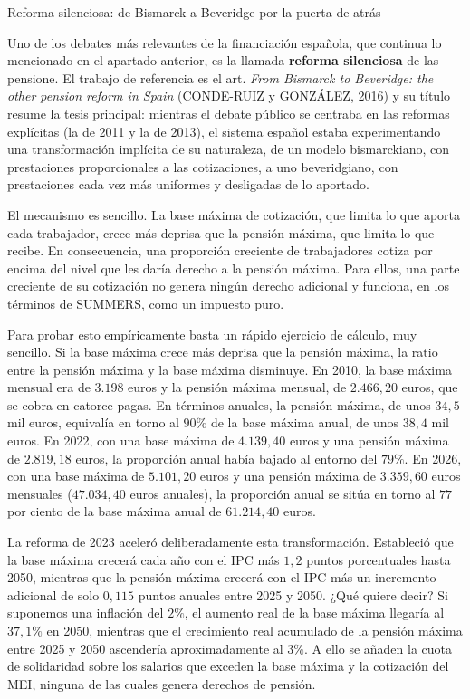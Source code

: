 \documentclass[10pt,a4paper]{article}
\begin{document}
Reforma silenciosa: de Bismarck a Beveridge por la puerta de atrás

Uno de los debates más relevantes de la financiación española, que continua lo mencionado en el apartado anterior, es la llamada \textbf{reforma silenciosa} de las pensione. El trabajo de referencia es el art. \textit{From Bismarck to Beveridge: the other pension reform in Spain} (CONDE-RUIZ y GONZÁLEZ, 2016) y su título resume la tesis principal: mientras el debate público se centraba en las reformas explícitas (la de 2011 y la de 2013), el sistema español estaba experimentando una transformación implícita de su naturaleza, de un modelo bismarckiano, con prestaciones proporcionales a las cotizaciones, a uno beveridgiano, con prestaciones cada vez más uniformes y desligadas de lo aportado. 

El mecanismo es sencillo. La base máxima de cotización, que limita lo que aporta cada trabajador, crece más deprisa que la pensión máxima, que limita lo que recibe. En consecuencia, una proporción creciente de trabajadores cotiza por encima del nivel que les daría derecho a la pensión máxima. Para ellos, una parte creciente de su cotización no genera ningún derecho adicional y funciona, en los términos de SUMMERS, como un impuesto puro.


Para probar esto empíricamente basta un rápido ejercicio de cálculo, muy sencillo. Si la base máxima crece más deprisa que la pensión máxima, la ratio entre la pensión máxima y la base máxima disminuye. En 2010, la base máxima mensual era de $3{.}198$ euros y la pensión máxima mensual, de $2{.}466,20$ euros, que se cobra en catorce pagas. En términos anuales, la pensión máxima, de unos $34,5$ mil euros, equivalía en torno al $90\%$ de la base máxima anual, de unos $38,4$ mil euros. En 2022, con una base máxima de $4{.}139,40$ euros y una pensión máxima de $2{.}819,18$ euros, la proporción anual había bajado al entorno del $79\%$. En 2026, con una base máxima de $5{.}101,20$ euros y una pensión máxima de $3{.}359,60$ euros mensuales ($47{.}034,40$ euros anuales), la proporción anual se sitúa en torno al $77$ por ciento de la base máxima anual de $61{.}214,40$ euros. 

La reforma de 2023 aceleró deliberadamente esta transformación. Estableció que la base máxima crecerá cada año con el IPC más $1,2$ puntos porcentuales hasta 2050, mientras que la pensión máxima crecerá con el IPC más un incremento adicional de solo $0,115$ puntos anuales entre 2025 y 2050. ¿Qué quiere decir? Si suponemos una inflación del $2\%$, el aumento real de la base máxima llegaría al $37,1\%$ en 2050, mientras que el crecimiento real acumulado de la pensión máxima entre 2025 y 2050 ascendería aproximadamente al $3\%$. A ello se añaden la cuota de solidaridad sobre los salarios que exceden la base máxima y la cotización del MEI, ninguna de las cuales genera derechos de pensión.
\end{document}
